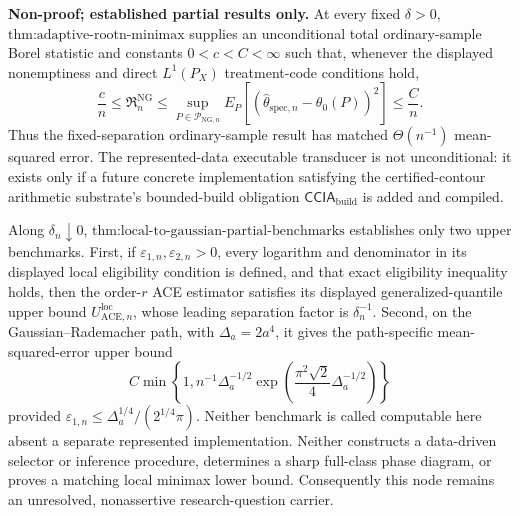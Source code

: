 \textbf{Non-proof; established partial results only.}  At every fixed \(\delta>0\), \(\text{thm:adaptive-rootn-minimax}\) supplies an unconditional total ordinary-sample Borel statistic and constants \(0<c<C<\infty\) such that, whenever the displayed nonemptiness and direct \(L^1(P_X)\) treatment-code conditions hold,
\[
 \frac{c}{n}
 \le \mathfrak R_n^{\mathrm{NG}}
 \le \sup_{P\in\mathcal P_{\mathrm{NG},n}}
 E_P\!\left[(\widehat\theta_{\mathrm{spec},n}-\theta_0(P))^2\right]
 \le \frac{C}{n}.
\]
Thus the fixed-separation ordinary-sample result has matched \(\Theta(n^{-1})\) mean-squared error.  The represented-data executable transducer is not unconditional: it exists only if a future concrete implementation satisfying the certified-contour arithmetic substrate's bounded-build obligation \(\mathsf{CCIA}_{\mathrm{build}}\) is added and compiled.

Along \(\delta_n\downarrow0\), \(\text{thm:local-to-gaussian-partial-benchmarks}\) establishes only two upper benchmarks.  First, if \(\varepsilon_{1,n},\varepsilon_{2,n}>0\), every logarithm and denominator in its displayed local eligibility condition is defined, and that exact eligibility inequality holds, then the order-\(r\) ACE estimator satisfies its displayed generalized-quantile upper bound \(U_{\mathrm{ACE},n}^{\mathrm{loc}}\), whose leading separation factor is \(\delta_n^{-1}\).  Second, on the Gaussian--Rademacher path, with \(\Delta_a=2a^4\), it gives the path-specific mean-squared-error upper bound
\[
 C\min\!\left\{
  1,
  n^{-1}\Delta_a^{-1/2}
  \exp\!\left(\frac{\pi^2\sqrt2}{4}\Delta_a^{-1/2}\right)
 \right\}
\]
provided \(\varepsilon_{1,n}\le\Delta_a^{1/4}/(2^{1/4}\pi)\).  Neither benchmark is called computable here absent a separate represented implementation.  Neither constructs a data-driven selector or inference procedure, determines a sharp full-class phase diagram, or proves a matching local minimax lower bound.  Consequently this node remains an unresolved, nonassertive research-question carrier.